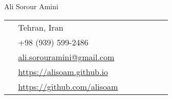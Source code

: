 \begin{paracol}{2}
  \parbox[top][0.12\textheight][c]{\linewidth}
  {
    \vspace{-0.04\textheight}
    \centering
    {\sffamily\Huge Ali Sorour Amini}
  }
  \switchcolumn
  \parbox[top][0.12\textheight][c]{\linewidth}
  {
    \vspace{-0.04\textheight}
    \colorbox{shade}
    {
      \begin{supertabular}{p{0.05\linewidth}|p{0.775\linewidth}}
        \raisebox{-1pt}{\faHome} & Tehran, Iran\\
        \raisebox{-1pt}{\faPhone} & +98 (939) 599-2486 \\
        \raisebox{0pt}{\small\faEnvelope} & \href{mailto:ali.sorouramini@gmail.com}{ali.sorouramini@gmail.com} \\
        \raisebox{-1pt}{\faLink} & \href{https://alisoam.github.io}{https://alisoam.github.io} \\
        \raisebox{-1pt}{\faGithub} & \href{https://github.com/AliSoAm}{https://github.com/alisoam} \\
      \end{supertabular}
    }
  }
\end{paracol}
